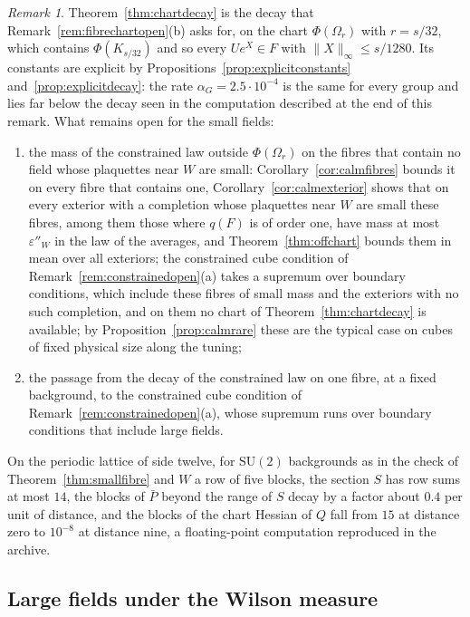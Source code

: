 \documentclass[11pt]{amsart}
\theoremstyle{definition}
\theoremstyle{remark}
\newtheorem{remark}[theorem]{Remark}
\numberwithin{equation}{section}
\newcommand{\SU}{\mathrm{SU}}
\begin{document}
\begin{remark}\label{rem:chartdecayopen}
Theorem~\ref{thm:chartdecay} is the decay that
Remark~\ref{rem:fibrechartopen}(b) asks for, on the chart $\Phi(\Omega_r)$
with $r=s/32$, which contains $\Phi(K_{s/32})$ and so every $Ue^X\in F$
with $\lVert X\rVert_\infty\le s/1280$. Its constants are explicit by
Propositions~\ref{prop:explicitconstants} and~\ref{prop:explicitdecay}:
the rate $\alpha_G=2.5\cdot10^{-4}$ is the same for every group and lies far
below the decay seen in the computation described at the end of this remark.
What remains open for the small fields:
\begin{enumerate}[label=\textup{(\alph*)},leftmargin=*]
\item the mass of the constrained law outside $\Phi(\Omega_r)$ on the
fibres that contain no field whose plaquettes near $W$ are small:
Corollary~\ref{cor:calmfibres} bounds it on every fibre that contains one,
Corollary~\ref{cor:calmexterior} shows that on every exterior with a
completion whose plaquettes near $W$ are small these fibres, among them those
where $q(F)$ is of order one, have mass at most $\varepsilon''_W$ in the law
of the averages, and Theorem~\ref{thm:offchart} bounds them in mean over all
exteriors; the constrained cube condition of
Remark~\ref{rem:constrainedopen}(a) takes a supremum over boundary
conditions, which include these fibres of small mass and the exteriors with
no such completion, and on them no chart of Theorem~\ref{thm:chartdecay} is
available; by Proposition~\ref{prop:calmrare} these are the typical case on
cubes of fixed physical size along the tuning;
\item the passage from the decay of the constrained law on one fibre, at
a fixed background, to the constrained cube condition of
Remark~\ref{rem:constrainedopen}(a), whose supremum runs over boundary
conditions that include large fields.
\end{enumerate}
On the periodic lattice of side twelve, for $\SU(2)$ backgrounds as in the
check of Theorem~\ref{thm:smallfibre} and $W$ a row of five blocks, the
section $S$ has row sums at most $14$, the blocks of $\bar P$ beyond the
range of $S$ decay by a factor about $0.4$ per unit of distance, and the
blocks of the chart Hessian of $Q$ fall from $15$ at distance zero to
$10^{-8}$ at distance nine, a floating-point computation reproduced in the
archive.
\end{remark}

\subsection{Large fields under the Wilson measure}\label{ssec:largefields}
\end{document}
